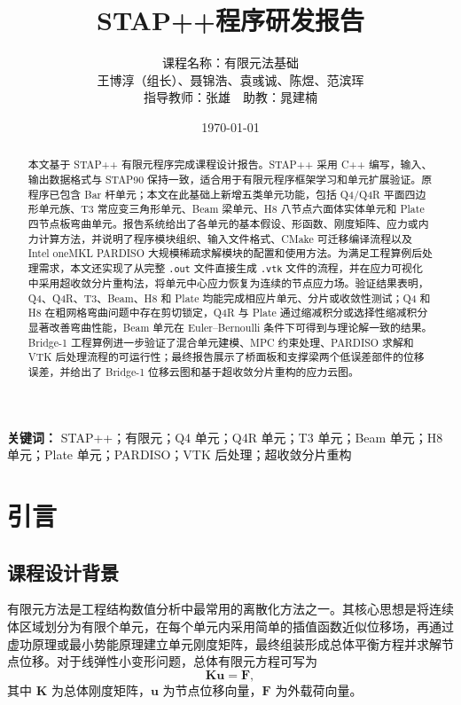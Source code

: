\documentclass[UTF8,a4paper,zihao=-4]{ctexart}
\title{\zihao{2}\bfseries STAP++程序研发报告}
\author{
    课程名称：有限元法基础\\
    王博淳（组长）、聂锦浩、袁彧诚、陈煜、范滨珲\\
    指导教师：张雄\ \ 助教：晁建楠
}
\date{\today}
\newcommand{\Kmat}{\bm{K}}
\newcommand{\Fvec}{\bm{F}}
\newcommand{\Uvec}{\bm{u}}
\begin{document}
\maketitle
\thispagestyle{empty}

\vspace{1em}

\begin{abstract}
本文基于 STAP++ 有限元程序完成课程设计报告。STAP++ 采用 C++ 编写，输入、输出数据格式与 STAP90 保持一致，适合用于有限元程序框架学习和单元扩展验证。原程序已包含 Bar 杆单元；本文在此基础上新增五类单元功能，包括 Q4/Q4R 平面四边形单元族、T3 常应变三角形单元、Beam 梁单元、H8 八节点六面体实体单元和 Plate 四节点板弯曲单元。报告系统给出了各单元的基本假设、形函数、刚度矩阵、应力或内力计算方法，并说明了程序模块组织、输入文件格式、CMake 可迁移编译流程以及 Intel oneMKL PARDISO 大规模稀疏求解模块的配置和使用方法。为满足工程算例后处理需求，本文还实现了从完整 \texttt{.out} 文件直接生成 \texttt{.vtk} 文件的流程，并在应力可视化中采用超收敛分片重构法，将单元中心应力恢复为连续的节点应力场。验证结果表明，Q4、Q4R、T3、Beam、H8 和 Plate 均能完成相应片单元、分片或收敛性测试；Q4 和 H8 在粗网格弯曲问题中存在剪切锁定，Q4R 与 Plate 通过缩减积分或选择性缩减积分显著改善弯曲性能，Beam 单元在 Euler--Bernoulli 条件下可得到与理论解一致的结果。Bridge-1 工程算例进一步验证了混合单元建模、MPC 约束处理、PARDISO 求解和 VTK 后处理流程的可运行性；最终报告展示了桥面板和支撑梁两个低误差部件的位移误差，并给出了 Bridge-1 位移云图和基于超收敛分片重构的应力云图。
\end{abstract}

\noindent\textbf{关键词：} STAP++；有限元；Q4 单元；Q4R 单元；T3 单元；Beam 单元；H8 单元；Plate 单元；PARDISO；VTK 后处理；超收敛分片重构

\newpage
\tableofcontents
\newpage

\section{引言}

\subsection{课程设计背景}

有限元方法是工程结构数值分析中最常用的离散化方法之一。其核心思想是将连续体区域划分为有限个单元，在每个单元内采用简单的插值函数近似位移场，再通过虚功原理或最小势能原理建立单元刚度矩阵，最终组装形成总体平衡方程并求解节点位移。对于线弹性小变形问题，总体有限元方程可写为
\begin{equation}
    \Kmat \Uvec = \Fvec ,
\end{equation}
其中 $\Kmat$ 为总体刚度矩阵，$\Uvec$ 为节点位移向量，$\Fvec$ 为外载荷向量。
\end{document}
